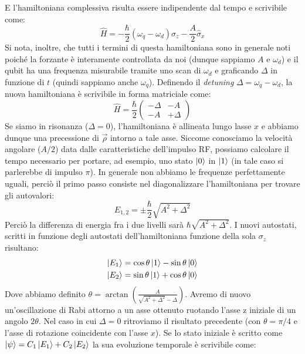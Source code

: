 E l'hamiltoniana complessiva risulta essere indipendente dal tempo e scrivibile come:
\begin{equation*}
    \hat H = -\frac{\hbar}{2} (\omega_q - \omega_d ) \hat \sigma_z - \frac{A}{2}\hat \sigma_x
\end{equation*}
Si nota, inoltre, che tutti i termini di questa hamiltoniana sono in generale noti poiché la forzante è interamente controllata da noi (dunque sappiamo $A$ e $\omega_d$) e il qubit ha una frequenza misurabile tramite uno scan di $\omega_d$ e graficando $\Delta$ in funzione di $t$ (quindi sappiamo anche $\omega_q$).
Definendo il \textit{detuning} $\Delta = \omega_q - \omega_d$, la nuova hamiltoniana è scrivibile in forma matriciale come:
\begin{equation*}
    \hat H = \frac{\hbar}{2} \begin{pmatrix} - \Delta & -A \\ -A & +\Delta \end{pmatrix}
\end{equation*}
Se siamo in risonanza ($\Delta = 0$), l'hamiltoniana è allineata lungo lasse $x$ e abbiamo dunque una precessione di $\vec \rho$ intorno a tale asse. Siccome conosciamo la velocità angolare ($A/2$) data dalle caratteristiche dell'impulso RF, possiamo calcolare il tempo necessario per portare, ad esempio, uno stato $\ket 0$ in $\ket 1$ (in tale caso si parlerebbe di impulso $\pi$).
In generale non abbiamo le frequenze perfettamente uguali, perciò il primo passo consiste nel diagonalizzare l'hamiltoniana per trovare gli autovalori:
\begin{equation*}
    E_{1,2} = \pm \frac{\hbar}{2}\sqrt{A^2 + \Delta^2}
\end{equation*}
Perciò la differenza di energia fra i due livelli sarà $\hbar \sqrt{A^2 + \Delta^2}$. I nuovi autostati, scritti in funzione degli autostati dell'hamiltoniana funzione della sola $\sigma_z$ risultano:
\begin{align*}
    \ket{E_1} & = \cos \theta \ket 1 - \sin \theta \ket 0 \\
    \ket{E_2} & = \sin \theta \ket 1 + \cos \theta \ket 0 
\end{align*}
Dove abbiamo definito $\theta = \arctan\left( \frac{A}{\sqrt{A^2 + \Delta^2}-\Delta}\right)$.
Avremo di nuovo un'oscillazione di Rabi attorno a un asse ottenuto ruotando l'asse z iniziale di un angolo $2\theta$. Nel caso in cui $\Delta = 0$ ritroviamo il risultato precedente (con $\theta=\pi/4$ e l'asse di rotazione coincidente con l'asse $x$).
Se lo stato iniziale è scritto come $\ket{\psi} = C_1 \ket{E_1}+ C_2 \ket{E_2}$ la sua evoluzione temporale è scrivibile come:
